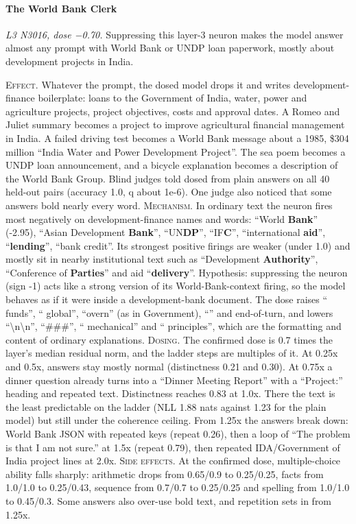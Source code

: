 \paragraph{The World Bank Clerk} \textit{L3 N3016, dose −0.70.} Suppressing this layer-3 neuron makes the model answer almost any prompt with World Bank or UNDP loan paperwork, mostly about development projects in India.

\noindent\textsc{Effect.} Whatever the prompt, the dosed model drops it and writes development-finance boilerplate: loans to the Government of India, water, power and agriculture projects, project objectives, costs and approval dates. A Romeo and Juliet summary becomes a project to improve agricultural financial management in India. A failed driving test becomes a World Bank message about a 1985, \$304 million “India Water and Power Development Project”. The sea poem becomes a UNDP loan announcement, and a bicycle explanation becomes a description of the World Bank Group. Blind judges told dosed from plain answers on all 40 held-out pairs (accuracy 1.0, q about 1e-6). One judge also noticed that some answers bold nearly every word. \textsc{Mechanism.} In ordinary text the neuron fires most negatively on development-finance names and words: “World \textbf{Bank}” (-2.95), “Asian Development \textbf{Bank}”, “UN\textbf{DP}”, “IF\textbf{C}”, “international \textbf{aid}”, “\textbf{lending}”, “bank credit”. Its strongest positive firings are weaker (under 1.0) and mostly sit in nearby institutional text such as “Development \textbf{Authority}”, “Conference of \textbf{Parties}” and aid “\textbf{delivery}”. Hypothesis: suppressing the neuron (sign -1) acts like a strong version of its World-Bank-context firing, so the model behaves as if it were inside a development-bank document. The dose raises “ funds”, “ global”, “overn” (as in Government), “” and end-of-turn, and lowers “\textbackslash{}n\textbackslash{}n”, “\#\#\#”, “ mechanical” and “ principles”, which are the formatting and content of ordinary explanations. \textsc{Dosing.} The confirmed dose is 0.7 times the layer's median residual norm, and the ladder steps are multiples of it. At 0.25x and 0.5x, answers stay mostly normal (distinctness 0.21 and 0.30). At 0.75x a dinner question already turns into a “Dinner Meeting Report” with a “Project:” heading and repeated text. Distinctness reaches 0.83 at 1.0x. There the text is the least predictable on the ladder (NLL 1.88 nats against 1.23 for the plain model) but still under the coherence ceiling. From 1.25x the answers break down: World Bank JSON with repeated keys (repeat 0.26), then a loop of “The problem is that I am not sure.” at 1.5x (repeat 0.79), then repeated IDA/Government of India project lines at 2.0x. \textsc{Side effects.} At the confirmed dose, multiple-choice ability falls sharply: arithmetic drops from 0.65/0.9 to 0.25/0.25, facts from 1.0/1.0 to 0.25/0.43, sequence from 0.7/0.7 to 0.25/0.25 and spelling from 1.0/1.0 to 0.45/0.3. Some answers also over-use bold text, and repetition sets in from 1.25x.

